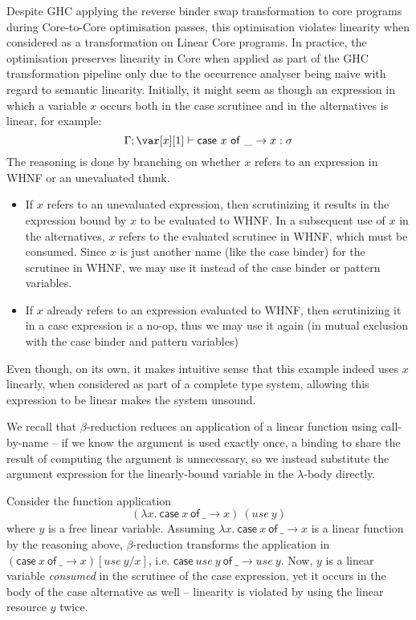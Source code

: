 \documentclass[acmsmall,review]{acmart}
\newcommand{\ccase}[2]{\mathsf{case}~#1~\mathsf{of}~#2}
\begin{document}
Despite GHC applying the reverse binder swap transformation to core programs
during Core-to-Core optimisation passes, this optimisation violates linearity
when considered as a transformation on Linear Core programs. In practice, the
optimisation preserves linearity in Core when applied as part of the GHC
transformation pipeline only due to the occurrence analyser being naive with
regard to semantic linearity. Initially, it might seem as though an expression
in which a variable $x$ occurs both in the case scrutinee and in the
alternatives is linear, for example:
\[
\G; \xl \vdash \ccase{x}{\_ \to x} : \s
\]
The reasoning is done by branching on whether $x$ refers to an expression in
WHNF or an unevaluated thunk.
\begin{itemize}
\item If $x$ refers to an unevaluated expression, then scrutinizing it results
in the expression bound by $x$ to be evaluated to WHNF. In a subsequent use of
$x$ in the alternatives, $x$ refers to the evaluated scrutinee in WHNF, which
must be consumed. Since $x$ is just another name (like the case binder) for the
scrutinee in WHNF, we may use it instead of the case binder or pattern
variables.
\item If $x$ already refers to an expression evaluated to WHNF, then
scrutinizing it in a case expression is a no-op, thus we may use it again (in
mutual exclusion with the case binder and pattern variables)
\end{itemize}
%
%
Even though, on its own, it makes intuitive sense that this example indeed uses
$x$ linearly, when considered as part of a complete type system, allowing this
expression to be linear makes the system unsound.

We recall that $\beta$-reduction reduces an application of a linear function
using call-by-name -- if we know the argument is used exactly once, a binding
to share the result of computing the argument is unnecessary, so we instead
substitute the argument expression for the linearly-bound variable in the
$\lambda$-body directly.

Consider the function application $$(\lambda x.~\ccase{x}{\_ \to x})~(use~y)$$
where $y$ is a free linear variable. Assuming $\lambda x.~\ccase{x}{\_ \to x}$
is a linear function by the reasoning above, $\beta$-reduction transforms the
application in $(\ccase{x}{\_ \to x})[use~y/x]$, i.e. $\ccase{use~y}{\_ \to
use~y}$. Now, $y$ is a linear variable \emph{consumed} in the scrutinee of the case
expression, yet it occurs in the body of the case alternative as well --
linearity is violated by using the linear resource $y$ twice.
\end{document}
